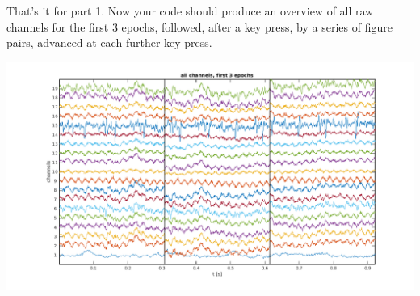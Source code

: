 \documentclass[10pt,a4paper,notitlepage]{report}
\begin{document}
That's it for part 1. Now your code should produce an overview of all raw channels for the first 3 epochs, followed, after a key press, by a series of figure pairs, advanced at each further key press.

\vspace{1cm}
\hspace{-1cm} \includegraphics[scale=0.5]{p3fig1.png}
\end{document}
